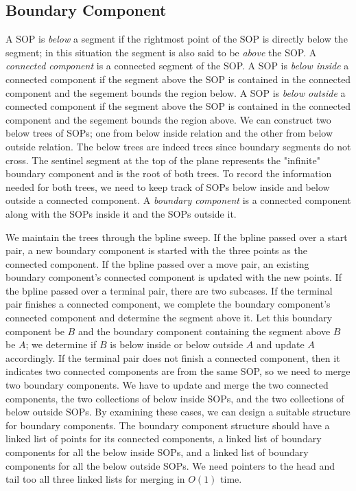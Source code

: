 \documentclass[11pt]{article}
\begin{document}
\subsection{Boundary Component} \label{sec bcycle}
A SOP is \textit{below} a segment if the rightmost point of the SOP is directly below the segment; in this situation the segment is also said to be \textit{above} the SOP.
A \textit{connected component} is a connected segment of the SOP.
A SOP is \textit{below inside} a connected component if the segment above the SOP is contained in the connected component and the segement bounds the region below.
A SOP is \textit{below outside} a connected component if the segment above the SOP is contained in the connected component and the segement bounds the region above.
We can construct two below trees of SOPs; one from below inside relation and the other from below outside relation.
The below trees are indeed trees since boundary segments do not cross.
The sentinel segment at the top of the plane represents the "infinite" boundary component and is the root of both trees.
To record the information needed for both trees, we need to keep track of SOPs below inside and below outside a connected component.
A \textit{boundary component} is a connected component along with the SOPs inside it and the SOPs outside it.

We maintain the trees through the bpline sweep.
If the bpline passed over a start pair, a new boundary component is started with the three points as the connected component.
If the bpline passed over a move pair, an existing boundary component's connected component is updated with the new points.
If the bpline passed over a terminal pair, there are two subcases.
If the terminal pair finishes a connected component, we complete the boundary component's connected component and determine the segment above it.
Let this boundary component be $B$ and the boundary component containing the segment above $B$ be $A$; we determine if $B$ is below inside or below outside $A$ and update $A$ accordingly.
If the terminal pair does not finish a connected component, then it indicates two connected components are from the same SOP, so we need to merge two boundary components.
We have to update and merge the two connected components, the two collections of below inside SOPs, and the two collections of below outside SOPs.
By examining these cases, we can design a suitable structure for boundary components.
The boundary component structure should have a linked list of points for its connected components, a linked list of boundary components for all the below inside SOPs, and a linked list of boundary components for all the below outside SOPs.
We need pointers to the head and tail too all three linked lists for merging in $O(1)$ time.
\end{document}
